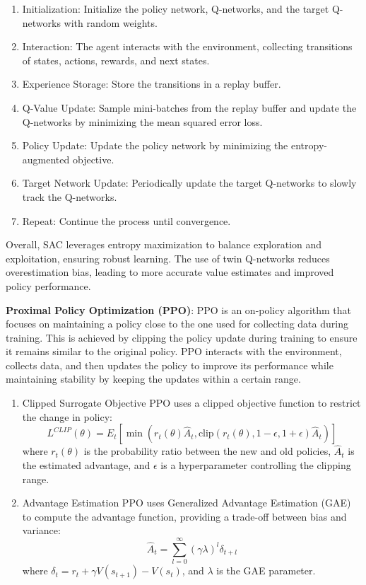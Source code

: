 \documentclass{article}
\begin{document}
\begin{enumerate}
    \item Initialization: Initialize the policy network, Q-networks, and the target
          Q-networks with random weights.
    \item Interaction: The agent interacts with the environment, collecting transitions
          of states, actions, rewards, and next states.
    \item Experience Storage: Store the transitions in a replay buffer.
    \item Q-Value Update: Sample mini-batches from the replay buffer and update the
          Q-networks by minimizing the mean squared error loss.
    \item Policy Update: Update the policy network by minimizing the entropy-augmented
          objective.
    \item Target Network Update: Periodically update the target Q-networks to slowly
          track the Q-networks.
    \item Repeat: Continue the process until convergence.
\end{enumerate}

Overall, SAC leverages entropy maximization to balance exploration and
exploitation, ensuring robust learning. The use of twin Q-networks reduces
overestimation bias, leading to more accurate value estimates and improved
policy performance.

\textbf{Proximal Policy Optimization (PPO)}: PPO is an on-policy algorithm that focuses
on maintaining a policy close to the one used for collecting data during
training. This is achieved by clipping the policy update during training to
ensure it remains similar to the original policy. PPO interacts with the
environment, collects data, and then updates the policy to improve its
performance while maintaining stability by keeping the updates within a certain
range.

\begin{enumerate}
\item Clipped Surrogate Objective
PPO uses a clipped objective function to restrict the change in policy:
\[
    L^{CLIP}(\theta) = E_t \left[ \min \left( r_t(\theta) \hat{A}_t, \text{clip}(r_t(\theta), 1 - \epsilon, 1 + \epsilon) \hat{A}_t \right) \right]
\]
where \( r_t(\theta) \) is the probability ratio between the new and old
policies, \( \hat{A}_t \) is the estimated advantage, and \( \epsilon \) is a
hyperparameter controlling the clipping range.


\item Advantage Estimation
PPO uses Generalized Advantage Estimation (GAE) to compute the advantage
function, providing a trade-off between bias and variance:
\[
    \hat{A}_t = \sum_{l=0}^{\infty} (\gamma \lambda)^l \delta_{t+l}
\]
where \( \delta_t = r_t + \gamma V(s_{t+1}) - V(s_t) \), and \( \lambda \) is
the GAE parameter.

\end{enumerate}
\end{document}

